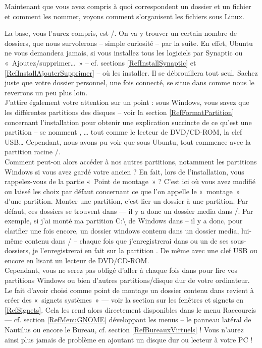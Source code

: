 Maintenant que vous avez compris à quoi correspondent un dossier et un fichier et comment les nommer, voyons comment s'organisent les fichiers sous Linux.\par
La base, vous l'aurez compris, est /. On va y trouver un certain nombre de dossiers, que nous survolerons -- simple curiosité -- par la suite. En effet, Ubuntu ne vous demandera jamais, si vous installez tous les logiciels par Synaptic ou «~Ajoutez/supprimer\ldots{}~» -- cf. sections \ref{RefInstallSynaptic} et \ref{RefInstallAjouterSupprimer} -- où les installer. Il se débrouillera tout seul. Sachez juste que votre dossier personnel, une fois connecté, se situe dans  comme nous le reverrons un peu plus loin.\\
J'attire également votre attention sur un point : sous Windows, vous savez que les différentes partitions des disques -- voir la section \ref{RefFormatPartition} concernant l'installation pour obtenir une explication succincte de ce qu'est une partition -- se nomment , \ldots{} tout comme le lecteur de DVD/CD-ROM, la clef USB\ldots{} Cependant, nous avons pu voir que sous Ubuntu, tout commence avec la partition racine /.\\
Comment peut-on alors accéder à nos autres partitions, notamment les partitions Windows si vous avez gardé votre ancien  ? En fait, lors de l'installation, vous rappelez-vous de la partie «~Point de montage~» ? C'est ici où vous avez modifié ou laissé les choix par défaut concernant ce que l'on appelle le «~montage~» d'une partition. Monter une partition, c'est lier un dossier à une partition. Par défaut, ces dossiers se trouvent dans  --- il y a donc un dossier media dans /. Par exemple, si j'ai monté ma partition C:\textbackslash{} de Windows dans  -- il y a donc, pour clarifier une fois encore, un dossier windows contenu dans un dossier media, lui-même contenu dans / -- chaque fois que j'enregistrerai dans  ou un de ses sous-dossiers, je l'enregistrerai en fait sur la partition . De même avec une clef USB ou encore en lisant un lecteur de DVD/CD-ROM.\\
Cependant, vous ne serez pas obligé d'aller à chaque fois dans  pour lire vos partitions Windows ou bien d'autres partitions/disque dur de votre ordinateur. Le fait d'avoir choisi comme point de montage un dossier contenu dans  revient à créer des «~signets systèmes~» --- voir la section sur les fenêtres et signets en \ref{RefSignets}. Cela les rend alors directement disponibles dans le menu Raccourcis --- cf. section \ref{RefMenuGNOME} développant les menus -- le panneau latéral de Nautilus ou encore le Bureau, cf. section \ref{RefBureauxVirtuels} ! Vous n'aurez ainsi plus jamais de problème en ajoutant un disque dur ou lecteur à votre PC !\par
